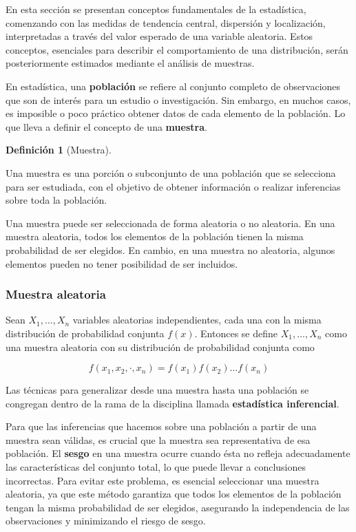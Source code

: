 \documentclass[
  us-letterpaper,
]{scrreprt}
\theoremstyle{plain}
\theoremstyle{definition}
\newtheorem{definition}{Definición}[chapter]
\theoremstyle{definition}
\theoremstyle{remark}
\begin{document}
En esta sección se presentan conceptos fundamentales de la estadística,
comenzando con las medidas de tendencia central, dispersión y
localización, interpretadas a través del valor esperado de una variable
aleatoria. Estos conceptos, esenciales para describir el comportamiento
de una distribución, serán posteriormente estimados mediante el análisis
de muestras.

En estadística, una \textbf{población} se refiere al conjunto completo
de observaciones que son de interés para un estudio o investigación. Sin
embargo, en muchos casos, es imposible o poco práctico obtener datos de
cada elemento de la población. Lo que lleva a definir el concepto de una
\textbf{muestra}.

\begin{definition}[Muestra]\protect\hypertarget{def-muestra}{}\label{def-muestra}

Una muestra es una porción o subconjunto de una población que se
selecciona para ser estudiada, con el objetivo de obtener información o
realizar inferencias sobre toda la población.

Una muestra puede ser seleccionada de forma aleatoria o no aleatoria. En
una muestra aleatoria, todos los elementos de la población tienen la
misma probabilidad de ser elegidos. En cambio, en una muestra no
aleatoria, algunos elementos pueden no tener posibilidad de ser
incluidos.

\end{definition}

\subsubsection{Muestra aleatoria}\label{muestra-aleatoria}

Sean \(X_1,\dots, X_n\) variables aleatorias independientes, cada una
con la misma distribución de probabilidad conjunta \(f(x)\). Entonces se
define \(X_1,\dots, X_n\) como una muestra aleatoria con su distribución
de probabilidad conjunta como

\[
f(x_1,x_2,\cdot, x_n) = f(x_1)f(x_2) \dots f(x_n)
\]

Las técnicas para generalizar desde una muestra hasta una población se
congregan dentro de la rama de la disciplina llamada \textbf{estadística
inferencial}.

Para que las inferencias que hacemos sobre una población a partir de una
muestra sean válidas, es crucial que la muestra sea representativa de
esa población. El \textbf{sesgo} en una muestra ocurre cuando ésta no
refleja adecuadamente las características del conjunto total, lo que
puede llevar a conclusiones incorrectas. Para evitar este problema, es
esencial seleccionar una muestra aleatoria, ya que este método garantiza
que todos los elementos de la población tengan la misma probabilidad de
ser elegidos, asegurando la independencia de las observaciones y
minimizando el riesgo de sesgo.
\end{document}
